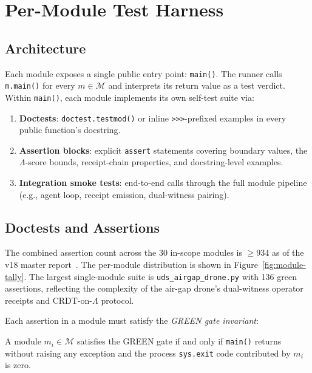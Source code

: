 \section{Per-Module Test Harness}
\label{sec:test-harness}

\subsection{Architecture}
\label{ssec:harness-arch}

Each module exposes a single public entry point: \texttt{main()}.  The runner
calls \texttt{m.main()} for every \(m \in \mathcal{M}\) and interprets its
return value as a test verdict.  Within \texttt{main()}, each module
implements its own self-test suite via:

\begin{enumerate}
  \item \textbf{Doctests}: \texttt{doctest.testmod()} or inline
    \texttt{>>>}-prefixed examples in every public function's docstring.
  \item \textbf{Assertion blocks}: explicit \texttt{assert} statements
    covering boundary values, the \(\Lambda\)-score bounds, receipt-chain
    properties, and docstring-level examples.
  \item \textbf{Integration smoke tests}: end-to-end calls through the full
    module pipeline (e.g., agent loop, receipt emission, dual-witness pairing).
\end{enumerate}

\subsection{Doctests and Assertions}
\label{ssec:doctests}

The combined assertion count across the 30 in-scope modules is $\geq 934$ as of the v18
master report~\cite{szl_master_v18}.  The per-module distribution is
shown in Figure~\ref{fig:module-tally}.  The largest single-module suite is
\texttt{uds\_airgap\_drone.py} with 136 green assertions, reflecting the
complexity of the air-gap drone's dual-witness operator receipts and
CRDT-on-\(\Lambda\) protocol.

Each assertion in a module must satisfy the \emph{GREEN gate invariant}:

\begin{definition}
  \label{def:green-gate}
  A module \(m_i \in \mathcal{M}\) satisfies the GREEN gate if and only if
  \texttt{main()} returns without raising any exception and the process
  \texttt{sys.exit} code contributed by \(m_i\) is zero.
\end{definition}

